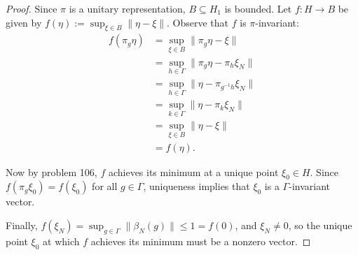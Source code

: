 \documentclass[a4paper,10pt]{report}
\begin{document}
\begin{enumerate}
\begin{enumerate}
\begin{proof}
					Since $\pi$ is a unitary representation, $B \subseteq H_1$ is bounded.
					Let $f : H \to B$ be given by $f(\eta) := \sup_{\xi \in B}{\|\eta - \xi\|}$.
					Observe that $f$ is $\pi$-invariant:
					\begin{align*}
						f(\pi_g\eta) & = \sup_{\xi \in B}{\|\pi_g\eta - \xi\|} \\
						 & = \sup_{h \in \Gamma}{\|\pi_g\eta - \pi_h \xi_N\|} \\
						 & = \sup_{h \in \Gamma}{\|\eta - \pi_{g^{-1}h} \xi_N\|} \\
						 & = \sup_{k \in \Gamma}{\|\eta - \pi_k \xi_N\|} \\
						 & = \sup_{\xi \in B}{\|\eta - \xi\|} \\
						 & = f(\eta).
					\end{align*}
					
					Now by problem 106, $f$ achieves its minimum at a unique point $\xi_0 \in H$.
					Since $f(\pi_g\xi_0) = f(\xi_0)$ for all $g \in \Gamma$,
					uniqueness implies that $\xi_0$ is a $\Gamma$-invariant vector.
					
					Finally, $f(\xi_N) = \sup_{g \in \Gamma}{\|\beta_N(g)\|} \le 1 = f(0)$,
					and $\xi_N \ne 0$, so the unique point $\xi_0$ at which $f$ achieves its minimum
					must be a nonzero vector.
				\end{proof}
		\end{enumerate}
\end{enumerate}
\end{document}

